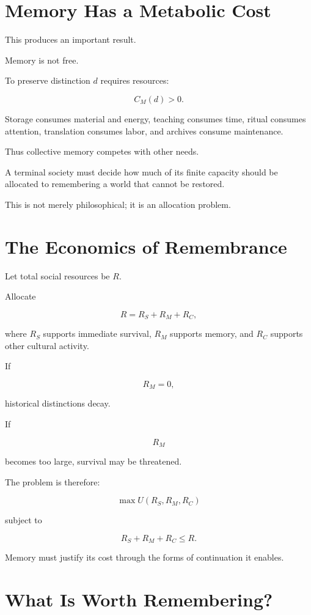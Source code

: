 \documentclass[11pt,oneside]{book}
\theoremstyle{definition}
\theoremstyle{remark}
\begin{document}
\section{Memory Has a Metabolic Cost}

This produces an important result.

Memory is not free.

To preserve distinction \(d\) requires resources:

\[
C_M(d)>0.
\]

Storage consumes material and energy, teaching consumes time, ritual consumes attention, translation consumes labor, and archives consume maintenance.

Thus collective memory competes with other needs.

A terminal society must decide how much of its finite capacity should be allocated to remembering a world that cannot be restored.

This is not merely philosophical; it is an allocation problem.

\section{The Economics of Remembrance}

Let total social resources be \(R\).

Allocate

\[
R
=
R_S+R_M+R_C,
\]

where \(R_S\) supports immediate survival, \(R_M\) supports memory, and \(R_C\) supports other cultural activity.

If

\[
R_M=0,
\]

historical distinctions decay.

If

\[
R_M
\]

becomes too large, survival may be threatened.

The problem is therefore:

\[
\max
U(R_S,R_M,R_C)
\]

subject to

\[
R_S+R_M+R_C\leq R.
\]

Memory must justify its cost through the forms of continuation it enables.

\section{What Is Worth Remembering?}
\end{document}
